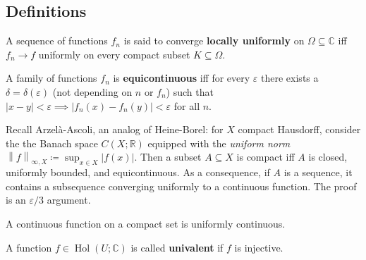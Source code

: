 \hypertarget{definitions}{%
\subsection{Definitions}\label{definitions}}

\begin{definition}

A sequence of functions \(f_n\) is said to converge \textbf{locally
uniformly} on \(\Omega \subseteq {\mathbb{C}}\) iff \(f_n\to f\)
uniformly on every compact subset \(K \subseteq \Omega\).

\end{definition}

\begin{definition}

A family of functions \(f_n\) is \textbf{equicontinuous} iff for every
\(\varepsilon\) there exists a \(\delta = \delta(\varepsilon)\) (not
depending on \(n\) or \(f_n\)) such that
\({\left\lvert {x-y} \right\rvert}<\varepsilon\implies {\left\lvert {f_n(x) - f_n(y)} \right\rvert} < \varepsilon\)
for all \(n\).

\end{definition}

\begin{remark}

Recall Arzelà-Ascoli, an analog of Heine-Borel: for \(X\) compact
Hausdorff, consider the the Banach space \(C(X; {\mathbb{R}})\) equipped
with the \emph{uniform norm}
\({\left\lVert {f} \right\rVert}_{\infty, X} \coloneqq\sup_{x\in X} {\left\lvert {f(x)} \right\rvert}\).
Then a subset \(A \subseteq X\) is compact iff \(A\) is closed,
uniformly bounded, and equicontinuous. As a consequence, if \(A\) is a
sequence, it contains a subsequence converging uniformly to a continuous
function. The proof is an \(\varepsilon/3\) argument.

\end{remark}

\begin{definition}

\end{definition}

\begin{remark}

A continuous function on a compact set is uniformly continuous.

\end{remark}

\begin{definition}

A function \(f\in \mathop{\mathrm{Hol}}(U; {\mathbb{C}})\) is called
\textbf{univalent} if \(f\) is injective.

\end{definition}

